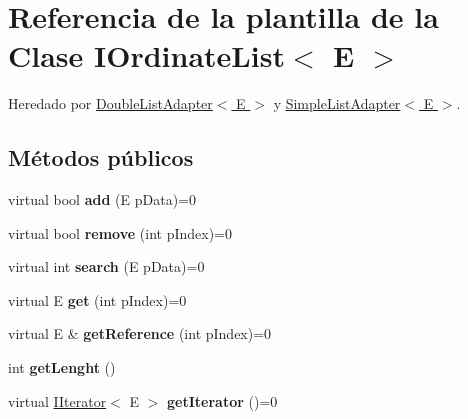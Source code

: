 \hypertarget{classIOrdinateList}{\section{Referencia de la plantilla de la Clase I\-Ordinate\-List$<$ E $>$}
\label{classIOrdinateList}
}


Heredado por \hyperlink{classDoubleListAdapter}{Double\-List\-Adapter$<$ E $>$} y \hyperlink{classSimpleListAdapter}{Simple\-List\-Adapter$<$ E $>$}.

\subsection*{Métodos públicos}
\begin{DoxyCompactItemize}
\item 
\hypertarget{classIOrdinateList_af158c9cda23201b2a17e857ffcdf4cdd}{virtual bool {\bfseries add} (E p\-Data)=0}\label{classIOrdinateList_af158c9cda23201b2a17e857ffcdf4cdd}

\item 
\hypertarget{classIOrdinateList_a1015be27579a09c4805505ea3e4c4752}{virtual bool {\bfseries remove} (int p\-Index)=0}\label{classIOrdinateList_a1015be27579a09c4805505ea3e4c4752}

\item 
\hypertarget{classIOrdinateList_a3f91689ab45f159d1056ea02cc0a264f}{virtual int {\bfseries search} (E p\-Data)=0}\label{classIOrdinateList_a3f91689ab45f159d1056ea02cc0a264f}

\item 
\hypertarget{classIOrdinateList_aef65b00ca705d1b106d51bff512b2021}{virtual E {\bfseries get} (int p\-Index)=0}\label{classIOrdinateList_aef65b00ca705d1b106d51bff512b2021}

\item 
\hypertarget{classIOrdinateList_a126adb3087d227a7bd47288002c6d48e}{virtual E \& {\bfseries get\-Reference} (int p\-Index)=0}\label{classIOrdinateList_a126adb3087d227a7bd47288002c6d48e}

\item 
\hypertarget{classIOrdinateList_acc0d473f2b9b464cc82b5e6cdb887b2a}{int {\bfseries get\-Lenght} ()}\label{classIOrdinateList_acc0d473f2b9b464cc82b5e6cdb887b2a}

\item 
\hypertarget{classIOrdinateList_a9c858a44a9188dd92647655d64bdb4b5}{virtual \hyperlink{classIIterator}{I\-Iterator}$<$ E $>$ {\bfseries get\-Iterator} ()=0}\label{classIOrdinateList_a9c858a44a9188dd92647655d64bdb4b5}

\end{DoxyCompactItemize}
